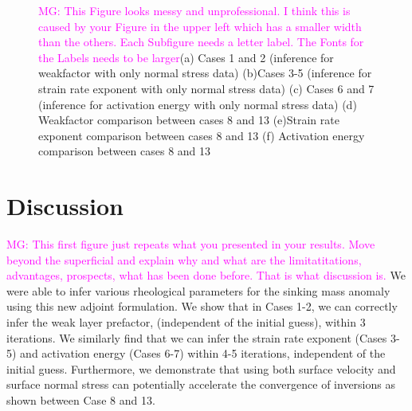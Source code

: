 \documentclass[12pt]{article}
\newcommand{\mgnote}[1]{\textcolor{magenta}{MG: #1}}
\begin{document}
\begin{figure}[H]
{}
\hspace{-0.1cm}
\caption{ \mgnote{This Figure looks messy and unprofessional. I think this is caused by your Figure in the upper left which has a smaller width than the others. Each Subfigure needs a letter label. The Fonts for the Labels needs to be larger}(a)  Cases 1 and 2 (inference for weakfactor with only normal stress data) (b)Cases 3-5 (inference for strain rate exponent with only normal stress data) (c) Cases 6 and 7 (inference for activation energy with only normal stress data) (d) Weakfactor comparison between cases 8 and 13 (e)Strain rate exponent comparison between cases 8 and 13 (f) Activation energy comparison between cases 8 and 13 }
\label{fig:topog_converge}
\end{figure}







	




\section*{Discussion}

\mgnote{This first figure just repeats what you presented in your results. Move beyond the superficial and explain why and what are the limitatitations, advantages, prospects, what has been done before. That is what discussion is.}
We were able to infer various rheological parameters for the sinking mass anomaly using this new adjoint formulation. We show that in Cases 1-2, we can correctly infer the weak layer prefactor, (independent of the initial guess), within 3 iterations. We similarly find that we can infer the strain rate exponent (Cases 3-5) and activation energy (Cases 6-7) within 4-5 iterations, independent of the initial guess.  Furthermore, we demonstrate that using both surface velocity and surface normal stress can potentially accelerate the convergence of inversions as shown between Case 8 and 13.
\end{document}
